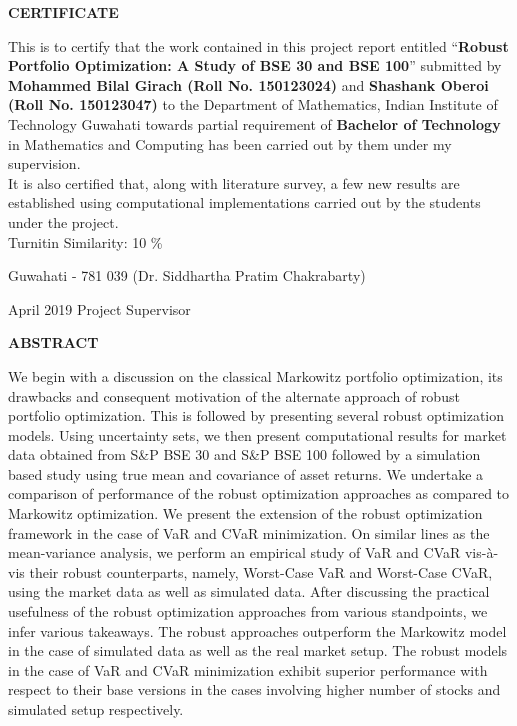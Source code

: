 \documentclass[12pt,a4paper]{report}
\theoremstyle{plain}
\theoremstyle{definition}
\theoremstyle{remark}
\begin{document}
\clearpage

 \setcounter{page}{2}
\begin{center}
{\Large{\bf{CERTIFICATE}}}
\end{center}


\noindent
This is to certify that the work contained in this project report entitled 
“\textbf{Robust Portfolio Optimization: A Study of BSE 30 and BSE 100}” submitted by \textbf{Mohammed Bilal Girach (Roll No. 150123024)} and \textbf{Shashank Oberoi (Roll No. 150123047)} 
to the Department of Mathematics, Indian Institute of Technology Guwahati towards partial requirement of
\textbf{Bachelor of Technology} in Mathematics and Computing has been carried out by them under
my supervision. \\

\noindent
It is also certified that, along with literature survey, a few new results are established using computational implementations carried out by the students under the project.\\

\noindent
Turnitin Similarity: 10 \%
%

\vspace{4cm}

\noindent Guwahati - 781 039 \hfill (Dr. Siddhartha Pratim Chakrabarty)

\noindent April 2019 \hfill Project Supervisor

\clearpage

\begin{center}
{\Large{\bf{ABSTRACT}}}
\end{center}


We begin with a discussion on the classical Markowitz portfolio optimization, its drawbacks and consequent motivation of the alternate approach of robust portfolio optimization. This is followed by presenting several robust optimization models. Using uncertainty sets, we then present computational results for market data obtained from S\&P BSE 30 and S\&P BSE 100 followed by a simulation based study using true mean and covariance of asset returns. We undertake a comparison of performance of the robust optimization approaches as compared to Markowitz optimization. We present the extension of the robust optimization framework in the case of VaR and CVaR minimization. On similar lines as the mean-variance analysis, we perform an empirical study of VaR and CVaR vis-\`a-vis their robust counterparts, namely, Worst-Case VaR and Worst-Case CVaR, using the market data as well as simulated data. After discussing the practical usefulness of the robust optimization approaches from various standpoints, we infer various takeaways. The robust approaches outperform the Markowitz model in the case of simulated data as well as the real market setup. The robust models in the case of VaR and CVaR minimization exhibit superior performance with respect to their base versions in the cases involving higher number of stocks and simulated setup respectively.
\end{document}
